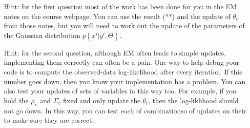 \documentclass{article}
\begin{document}
Hint: for the first question most of the work has been done for you in the EM notes on the course webpage. You can use the result (**) and the update of $\theta_c$ from those notes, but you will need to work out the update of the parameters of the Gaussian distribution $p(x^i | y^i, \Theta)$.

Hint: for the second question, although EM often leads to simple updates, implementing them correctly can often be a pain. One way to help debug your code is to compute the observed-data log-likelihood after every iteration. If this number goes down, then you know your implementation has a problem. You can also test your updates of sets of variables in this way too. For example, if you hold the $\mu_c$ and $\Sigma_c$ fixed and only update the $\theta_c$, then the log-liklihood should not go down. In this way, you can test each of combinationso of updates on their to make sure they are correct.



\newpage
\end{document}
